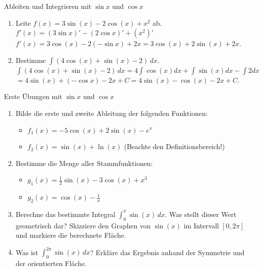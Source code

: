 \begin{beispielumgebung}{Ableiten und Integrieren mit $\sin x$ und $\cos x$}
\begin{enumerate}
    \item Leite $f(x) = 3\sin(x) - 2\cos(x) + x^2$ ab.
        $f'(x) = (3\sin x)' - (2\cos x)' + (x^2)'$
        $f'(x) = 3\cos(x) - 2(-\sin x) + 2x = 3\cos(x) + 2\sin(x) + 2x$.
    \item Bestimme $\int (4\cos(x) + \sin(x) - 2) \,dx$.
        $\int (4\cos(x) + \sin(x) - 2) \,dx = 4\int\cos(x)dx + \int\sin(x)dx - \int 2dx$
        $= 4\sin(x) + (-\cos x) - 2x + C = 4\sin(x) - \cos(x) - 2x + C$.
\end{enumerate}
\end{beispielumgebung}

\begin{aufgabenumgebung}{Erste Übungen mit $\sin x$ und $\cos x$}
\begin{enumerate}
    \item Bilde die erste und zweite Ableitung der folgenden Funktionen:
        \begin{itemize}
            \item $f_1(x) = -5\cos(x) + 2\sin(x) - e^x$
            \item $f_2(x) = \sin(x) + \ln(x)$ (Beachte den Definitionsbereich!)
        \end{itemize}
    \item Bestimme die Menge aller Stammfunktionen:
        \begin{itemize}
            \item $g_1(x) = \frac{1}{2}\sin(x) - 3\cos(x) + x^3$
            \item $g_2(x) = \cos(x) - \frac{1}{x}$
        \end{itemize}
    \item Berechne das bestimmte Integral $\int_0^{\pi} \sin(x) \,dx$. Was stellt dieser Wert geometrisch dar? Skizziere den Graphen von $\sin(x)$ im Intervall $[0, 2\pi]$ und markiere die berechnete Fläche.
    \item Was ist $\int_0^{2\pi} \sin(x) \,dx$? Erkläre das Ergebnis anhand der Symmetrie und der orientierten Fläche.
\end{enumerate}
\end{aufgabenumgebung}




